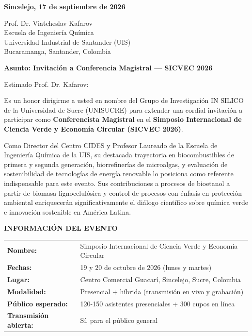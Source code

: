 \documentclass[12pt,a4paper]{article}
\begin{document}
\vspace{0.5cm}

\noindent
\textbf{Sincelejo, 17 de septiembre de 2026}

\vspace{0.8cm}

\noindent
Prof. Dr. Viatcheslav Kafarov\\
Escuela de Ingeniería Química\\
Universidad Industrial de Santander (UIS)\\
Bucaramanga, Santander, Colombia

\vspace{0.8cm}

\noindent
\textbf{\large Asunto: Invitación a Conferencia Magistral — SICVEC 2026}

\vspace{0.8cm}

Estimado Prof. Dr. Kafarov:

\vspace{0.8cm}

Es un honor dirigirme a usted en nombre del Grupo de Investigación IN SILICO de la Universidad de Sucre (UNISUCRE) para extender una cordial invitación a participar como \textbf{Conferencista Magistral} en el \textbf{Simposio Internacional de Ciencia Verde y Economía Circular (SICVEC 2026)}.

Como Director del Centro CIDES y Profesor Laureado de la Escuela de Ingeniería Química de la UIS, su destacada trayectoria en biocombustibles de primera y segunda generación, biorrefinerías de microalgas, y evaluación de sostenibilidad de tecnologías de energía renovable lo posiciona como referente indispensable para este evento. Sus contribuciones a procesos de bioetanol a partir de biomasa lignocelulósica y control de procesos con énfasis en protección ambiental enriquecerán significativamente el diálogo científico sobre química verde e innovación sostenible en América Latina.

\vspace{0.5cm}

\noindent
\textbf{INFORMACIÓN DEL EVENTO}

\begin{tabular}{ll}
\textbf{Nombre:} & Simposio Internacional de Ciencia Verde y Economía Circular \\
\textbf{Fechas:} & 19 y 20 de octubre de 2026 (lunes y martes) \\
\textbf{Lugar:} & Centro Comercial Guacarí, Sincelejo, Sucre, Colombia \\
\textbf{Modalidad:} & Presencial + híbrida (transmisión en vivo y grabación) \\
\textbf{Público esperado:} & 120-150 asistentes presenciales + 300 cupos en línea \\
\textbf{Transmisión abierta:} & Sí, para el público general \\
\end{tabular}
\end{document}
